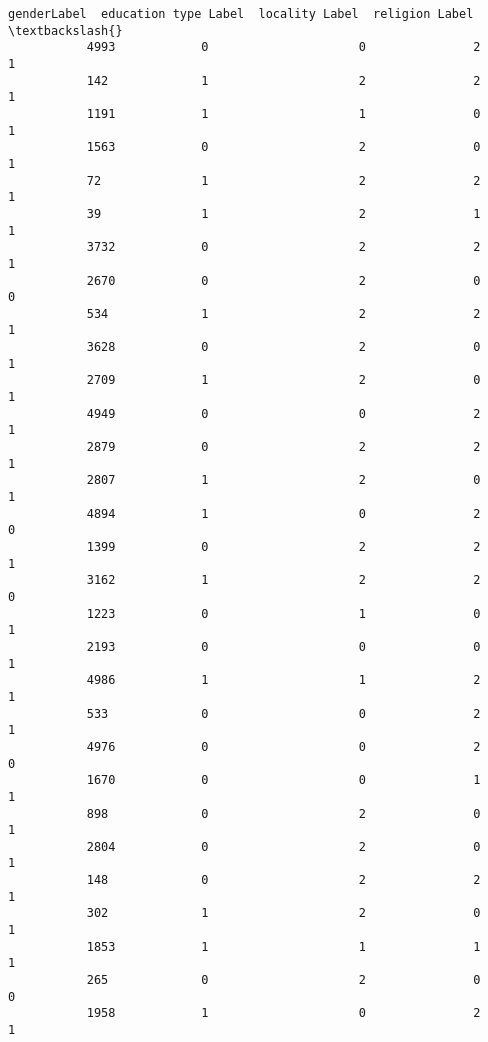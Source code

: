 \documentclass[11pt]{article}
\begin{document}
\begin{Verbatim}[commandchars=\\\{\}]
                 genderLabel  education type Label  locality Label  religion Label  \textbackslash{}
           4993            0                     0               2               1   
           142             1                     2               2               1   
           1191            1                     1               0               1   
           1563            0                     2               0               1   
           72              1                     2               2               1   
           39              1                     2               1               1   
           3732            0                     2               2               1   
           2670            0                     2               0               0   
           534             1                     2               2               1   
           3628            0                     2               0               1   
           2709            1                     2               0               1   
           4949            0                     0               2               1   
           2879            0                     2               2               1   
           2807            1                     2               0               1   
           4894            1                     0               2               0   
           1399            0                     2               2               1   
           3162            1                     2               2               0   
           1223            0                     1               0               1   
           2193            0                     0               0               1   
           4986            1                     1               2               1   
           533             0                     0               2               1   
           4976            0                     0               2               0   
           1670            0                     0               1               1   
           898             0                     2               0               1   
           2804            0                     2               0               1   
           148             0                     2               2               1   
           302             1                     2               0               1   
           1853            1                     1               1               1   
           265             0                     2               0               0   
           1958            1                     0               2               1   

\end{Verbatim}
\end{document}
